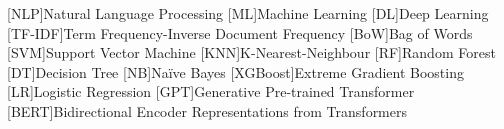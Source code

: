 [NLP]{Natural Language Processing}
[ML]{Machine Learning}
[DL]{Deep Learning}
[TF-IDF]{Term Frequency-Inverse Document Frequency}
[BoW]{Bag of Words}
[SVM]{Support Vector Machine}
[KNN]{K-Nearest-Neighbour}
[RF]{Random Forest}
[DT]{Decision Tree}
[NB]{Naïve Bayes}
[XGBoost]{Extreme Gradient Boosting}
[LR]{Logistic Regression}
[GPT]{Generative Pre-trained Transformer}
[BERT]{Bidirectional Encoder Representations from Transformers}


